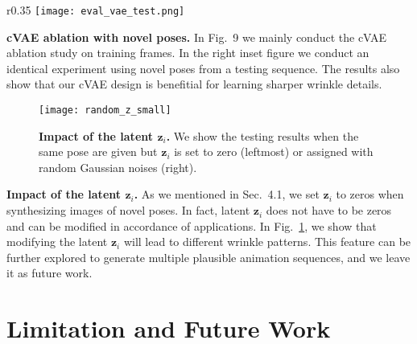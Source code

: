 \begin{wrapfigure}{r}{0.35\linewidth}
\vspace{-2mm}
\hspace{-5mm}
\texttt{[image: eval\_vae\_test.png]}
\end{wrapfigure}
\noindent\textbf{cVAE ablation with novel poses.} 
In Fig.~9 we mainly conduct the cVAE ablation study on training frames. 
In the right inset figure we conduct an identical experiment using novel poses from a testing sequence. The results also show that our cVAE design is benefitial for learning sharper wrinkle details. 



\begin{figure}
    \centering
    \texttt{[image: random\_z\_small]}
    \caption{\textbf{Impact of the latent $\bm{z}_i$.} We show the testing results when the same pose are given but $\bm{z}_i$ is set to zero (leftmost) or assigned with random Gaussian noises (right). }
    \label{fig:latent_z}
\end{figure}

\noindent\textbf{Impact of the latent $\bm{z}_i$.} As we mentioned in Sec.~4.1, we set $\bm{z}_i$ to zeros when synthesizing images of novel poses. In fact, latent $\bm{z}_i$ does not have to be zeros and can be modified in accordance of applications. In Fig.~\ref{fig:latent_z}, we show that modifying the latent $\bm{z}_i$ will lead to different wrinkle patterns. This feature can be further explored to generate multiple plausible animation sequences, and we leave it as future work. 








\section{Limitation and Future Work}
\label{sec:limitation}

